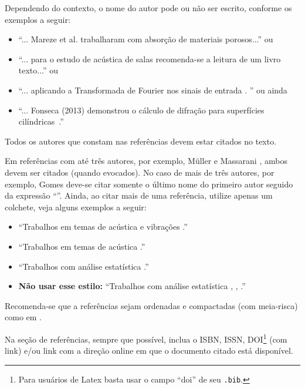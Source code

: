 \documentclass[12pt, a4paper, twoside, twocolumn]{article}
\begin{document}
Dependendo do contexto, o nome do autor pode ou não ser escrito, conforme os exemplos a seguir: 
%
\begin{itemize}[noitemsep,topsep=0ex] \itemsep=4pt
	\item 	``... Mareze et al. \cite{Mareze-2019} trabalharam com absorção de materiais porosos...'' ou 
	
	\item ``... para o estudo de acústica de salas \cite{Brandao-2017} recomenda-se a leitura de um livro texto...'' ou
	\item ``... aplicando a Transformada de Fourier nos sinais de entrada \cite{Oppenheim-2010}. '' ou ainda
	\item ``... Fonseca (2013) demonstrou o cálculo de difração para superfícies cilíndricas~\cite{Fonseca-2013}.''
\end{itemize}
%
Todos os autores que constam nas referências devem estar citados no texto.

Em referências com até três autores, por exemplo, Müller e Massarani \cite{Muller-2001}, ambos devem ser citados (quando evocados). No caso de mais de três autores, por exemplo, Gomes \etal \cite{Gomes-2015} deve-se citar somente o último nome do primeiro autor seguido da expressão ``\etal''. Ainda, ao citar mais de uma referência, utilize apenas um colchete, veja alguns exemplos a seguir:
%
\begin{itemize}[noitemsep,topsep=0ex] \itemsep=8pt
	\item 	``Trabalhos em temas de acústica e vibrações \cite{Mareze-2017,Fonseca-2013,Brandao-2017}.''
	\item ``Trabalhos em temas de acústica \cite{Mareze-2017,Oppenheim-2010,Muller-2001,Mareze-2019}.''
	\item ``Trabalhos com análise estatística \cite{Mareze-2017, Brandao-2017, Borges-2018}.''
		\item \textbf{Não usar esse estilo:} ``Trabalhos com análise estatística \cite{Mareze-2017}, \cite{Brandao-2017}, \cite{Ristow-2016}.''
\end{itemize}
%
Recomenda-se que a referências sejam ordenadas e compactadas (com meia-risca) como em \cite{Mareze-2017,Oppenheim-2010,Muller-2001,Mareze-2019}.

Na seção de referências, sempre que possível, inclua o ISBN, ISSN, DOI\footnote{Para usuários de Latex basta usar o campo ``doi'' de seu \texttt{.bib}.} (com link) e/ou link com a direção online em que o documento citado está disponível.
\end{document}
